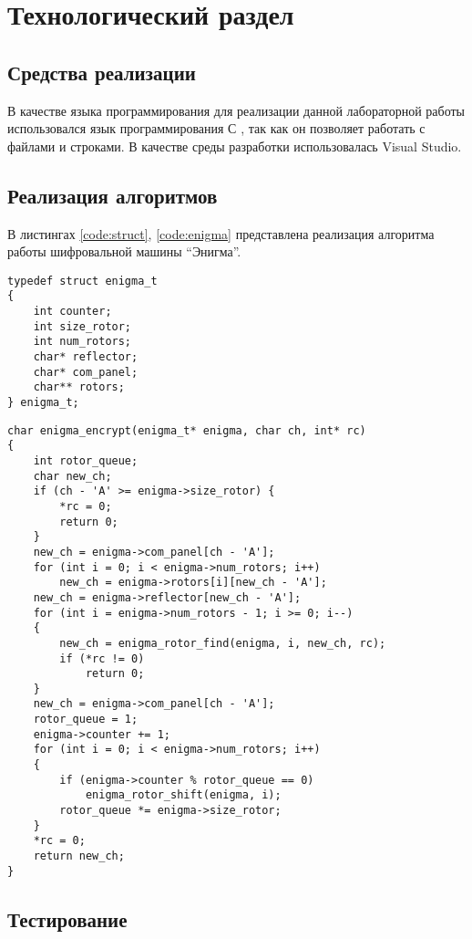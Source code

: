 \chapter{Технологический раздел}
\label{cha:impl}

\section{Средства реализации}

В качестве языка программирования для реализации данной лабораторной работы использовался язык программирования С \cite{c_lang}, так как он позволяет работать с файлами и  строками. В качестве среды разработки использовалась Visual Studio.

\section{Реализация алгоритмов}

В листингах \ref{code:struct}, \ref{code:enigma} представлена реализация алгоритма работы шифровальной машины ``Энигма''.

\begin{lstlisting}[label=code:struct, caption=Структура enigma\_t]
typedef struct enigma_t 
{
	int counter;
	int size_rotor;
	int num_rotors;
	char* reflector;
	char* com_panel;
	char** rotors;
} enigma_t;
\end{lstlisting}

\begin{lstlisting}[label=code:enigma,caption=Реализация алгоритма работы шифровальной машины ``Энигма'']
char enigma_encrypt(enigma_t* enigma, char ch, int* rc) 
{
	int rotor_queue;
	char new_ch;
	if (ch - 'A' >= enigma->size_rotor) {
		*rc = 0;
		return 0;
	}
	new_ch = enigma->com_panel[ch - 'A'];
	for (int i = 0; i < enigma->num_rotors; i++)
		new_ch = enigma->rotors[i][new_ch - 'A'];
	new_ch = enigma->reflector[new_ch - 'A'];
	for (int i = enigma->num_rotors - 1; i >= 0; i--) 
	{
		new_ch = enigma_rotor_find(enigma, i, new_ch, rc);
		if (*rc != 0) 
			return 0;
	}
	new_ch = enigma->com_panel[ch - 'A'];
	rotor_queue = 1;
	enigma->counter += 1;
	for (int i = 0; i < enigma->num_rotors; i++) 
	{
		if (enigma->counter % rotor_queue == 0) 
			enigma_rotor_shift(enigma, i);
		rotor_queue *= enigma->size_rotor;
	}
	*rc = 0;
	return new_ch;
}
\end{lstlisting}

\section{Тестирование}

